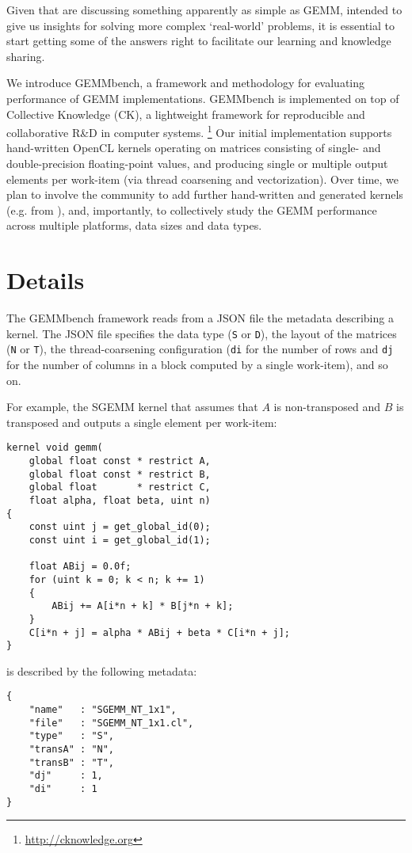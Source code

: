 \documentclass{acm_proc_article-sp} %
\begin{document}
Given that are discussing something apparently as simple as GEMM, intended to
give us insights for solving more complex `real-world' problems, it is
essential to start getting some of the answers right to facilitate our learning
and knowledge sharing.

We introduce GEMMbench, a framework and methodology for evaluating performance
of GEMM implementations.
%
GEMMbench is implemented on top of Collective Knowledge (CK), a lightweight
framework for reproducible and collaborative R\&D in computer systems.%
\footnote{\url{http://cknowledge.org}}
%
Our initial implementation supports hand-written OpenCL kernels operating on
matrices consisting of single- and double-precision floating-point values, and
producing single or multiple output elements per work-item (via thread
coarsening and vectorization).
%
Over time, we plan to involve the community to add further hand-written and
generated kernels (e.g. from \cite{Beaugnon:2014,Steuwer:2015}), and,
importantly, to collectively study the GEMM performance across multiple
platforms, data sizes and data types.


\section{Details}
\label{sec:details}

%
The GEMMbench framework reads from a JSON file the metadata describing a
kernel.
%
The JSON file specifies the data type ({\tt S} or {\tt D}), the layout of the
matrices ({\tt N} or {\tt T}), the thread-coarsening configuration ({\tt di}
for the number of rows and {\tt dj} for the number of columns in a block
computed by a single work-item), and so on.

For example, the SGEMM kernel that assumes that $A$ is non-transposed and $B$
is transposed and outputs a single element per work-item:
%
\begin{verbatim}
kernel void gemm(
    global float const * restrict A,
    global float const * restrict B,
    global float       * restrict C,
    float alpha, float beta, uint n)
{
    const uint j = get_global_id(0);
    const uint i = get_global_id(1);

    float ABij = 0.0f;
    for (uint k = 0; k < n; k += 1)
    {
        ABij += A[i*n + k] * B[j*n + k];
    }
    C[i*n + j] = alpha * ABij + beta * C[i*n + j];
}
\end{verbatim}
%
is described by the following metadata:
%
\begin{verbatim}
{
    "name"   : "SGEMM_NT_1x1",
    "file"   : "SGEMM_NT_1x1.cl",
    "type"   : "S",
    "transA" : "N",
    "transB" : "T",
    "dj"     : 1,
    "di"     : 1
}
\end{verbatim}
\end{document}
